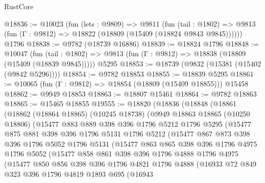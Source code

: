 \begin{lexlean}{RustCore}
\begin{coremodule}
@18836 := @10023
    (fun (lets : @9809) =>
    @9811
      (fun (tail : @1802) =>
      @9813 (fun (Γ : @9812) => @18822 (@18809 (@15409 (@18824 @9843 @9845))))))
    @1796
@18838 := @9782 (@18739 @16886)
@18839 := @18824 @1796
@18848 := @10047
    (fun (tail : @1802) => @9813 (fun (Γ : @9812) => @18838 (@18809 (@15409 (@18839 @9845)))))
    @5295
@18853 := @18739 (@9832 (@15381 (@15402 (@9842 @5296))))
@18854 := @9782 @18853
@18855 := @18839 @5295
@18861 := @10065 (fun (Γ : @9812) => @18854 (@18809 (@15409 @18855))) @15458
@18862 := @9949 @18853
@18863 := @18807 @15461
@18864 := @9782 @18863
@18865 := @15465 @18855
@19555 := @18820
    (@18836
      (@18848
        (@18861
          (@18862
            (@18864 @18865)
            (@10245 @18738)
            (@9949
              @18863
              @18865
              (@10250 @18806)
              (@15477
                @883
                @889
                @398
                @396
                @1796
                @5212
                @1796
                @5295
                (@15477
                  @875
                  @881
                  @398
                  @396
                  @1796
                  @5131
                  @1796
                  @5212
                  (@15477
                    @867
                    @873
                    @398
                    @396
                    @1796
                    @5052
                    @1796
                    @5131
                    (@15477
                      @863
                      @865
                      @398
                      @396
                      @1796
                      @4975
                      @1796
                      @5052
                      (@15477
                        @858
                        @861
                        @398
                        @396
                        @1796
                        @4888
                        @1796
                        @4975
                        (@15477
                          @850
                          @856
                          @398
                          @396
                          @1796
                          @4821
                          @1796
                          @4888
                          (@16933
                            @72
                            @849
                            @323
                            @396
                            @1796
                            @4819
                            @1893
                            @695
                            (@16943

\end{coremodule}
\end{lexlean}
